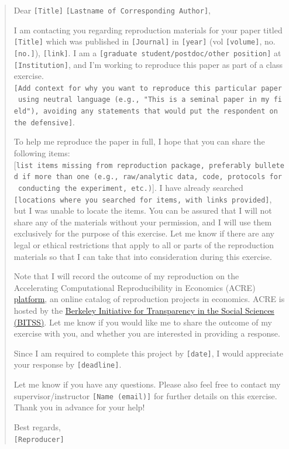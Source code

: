\documentclass[]{book}
\begin{document}
\begin{quote}
Dear \texttt{{[}Title{]}} \texttt{{[}Lastname\ of\ Corresponding\ Author{]}},

I am contacting you regarding reproduction materials for your paper titled \texttt{{[}Title{]}} which was published in \texttt{{[}Journal{]}} in \texttt{{[}year{]}} (vol \texttt{{[}volume{]}}, no. \texttt{{[}no.{]}}), \texttt{{[}link{]}}.
I am a \texttt{{[}graduate\ student/postdoc/other\ position{]}} at \texttt{{[}Institution{]}}, and I'm working to reproduce this paper as part of a class exercise. \texttt{{[}Add\ context\ for\ why\ you\ want\ to\ reproduce\ this\ particular\ paper\ using\ neutral\ language\ (e.g.,\ "This\ is\ a\ seminal\ paper\ in\ my\ field"),\ avoiding\ any\ statements\ that\ would\ put\ the\ respondent\ on\ the\ defensive{]}}.

To help me reproduce the paper in full, I hope that you can share the following items: {[}\texttt{list\ items\ missing\ from\ reproduction\ package,\ preferably\ bulleted\ if\ more\ than\ one\ (e.g.,\ raw/analytic\ data,\ code,\ protocols\ for\ conducting\ the\ experiment,\ etc.)}{]}. I have already searched \texttt{{[}locations\ where\ you\ searched\ for\ items,\ with\ links\ provided{]}}, but I was unable to locate the items. You can be assured that I will not share any of the materials without your permission, and I will use them exclusively for the purpose of this exercise. Let me know if there are any legal or ethical restrictions that apply to all or parts of the reproduction materials so that I can take that into consideration during this exercise.

Note that I will record the outcome of my reproduction on the Accelerating Computational Reproducibility in Economics (ACRE) \href{https://www.bitss.org/ecosystem/acre/}{platform}, an online catalog of reproduction projects in economics. ACRE is hosted by the \href{https://www.bitss.org/}{Berkeley Initiative for Transparency in the Social Sciences (BITSS)}. Let me know if you would like me to share the outcome of my exercise with you, and whether you are interested in providing a response.

Since I am required to complete this project by \texttt{{[}date{]}}, I would appreciate your response by \texttt{{[}deadline{]}}.

Let me know if you have any questions. Please also feel free to contact my supervisor/instructor \texttt{{[}Name\ (email){]}} for further details on this exercise. Thank you in advance for your help!

Best regards,\\
\texttt{{[}Reproducer{]}}
\end{quote}
\end{document}
